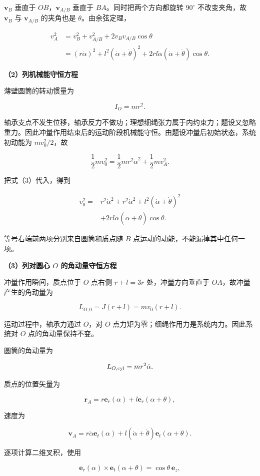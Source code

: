 \documentclass[12pt,a4paper,UTF8]{ctexart}
\begin{document}
\(\bm v_B\) 垂直于 \(OB\)，\(\bm v_{A/B}\) 垂直于
\(BA\)。同时把两个方向都旋转 \(90^\circ\) 不改变夹角，故 \(\bm v_B\) 与
\(\bm v_{A/B}\) 的夹角也是 \(\theta\)。由余弦定理，

\[
\begin{aligned}
v_A^2
&=v_B^2+v_{A/B}^2+2v_Bv_{A/B}\cos\theta\\
&=(r\dot\alpha)^2+l^2(\dot\alpha+\dot\theta)^2
+2rl\dot\alpha(\dot\alpha+\dot\theta)\cos\theta.
\end{aligned}
\tag{3}
\]

\textbf{（2）列机械能守恒方程}

薄壁圆筒的转动惯量为

\[
I_O=mr^2.
\]

轴承支点不发生位移，轴承反力不做功；理想细绳张力属于内约束力；题设又忽略重力。因此冲量作用结束后的运动阶段机械能守恒。由题设冲量后初始状态，系统初动能为
\(mv_0^2/2\)，故

\[
\frac12mv_0^2
=\frac12mr^2\dot\alpha^2+\frac12mv_A^2.
\tag{4}
\]

把式（3）代入，得到

\[
\begin{aligned}
v_0^2={}&r^2\dot\alpha^2
+r^2\dot\alpha^2
+l^2(\dot\alpha+\dot\theta)^2\\
&+2rl\dot\alpha(\dot\alpha+\dot\theta)\cos\theta.
\end{aligned}
\tag{5}
\]

等号右端前两项分别来自圆筒和质点随 \(B\)
点运动的动能，不能漏掉其中任何一项。

\textbf{（3）列对圆心 \(O\) 的角动量守恒方程}

冲量作用瞬间，质点位于 \(O\) 点右侧 \(r+l=3r\) 处，冲量方向垂直于
\(OA\)，故冲量产生的角动量为

\[
L_{O,0}=J(r+l)=mv_0(r+l).
\tag{6}
\]

运动过程中，轴承力通过 \(O\)，对 \(O\)
点力矩为零；细绳作用力是系统内力。因此系统对 \(O\) 点的角动量保持不变。

圆筒的角动量为

\[
L_{O,\rm cyl}=mr^2\dot\alpha.
\]

质点的位置矢量为

\[
\bm r_A=r\bm e_r(\alpha)+l\bm e_r(\alpha+\theta),
\]

速度为

\[
\bm v_A=r\dot\alpha\bm e_t(\alpha)
+l(\dot\alpha+\dot\theta)\bm e_t(\alpha+\theta).
\]

逐项计算二维叉积，使用

\[
\bm e_r(\alpha)\times\bm e_t(\alpha+\theta)=\cos\theta\,\bm e_z,
\]
\end{document}
